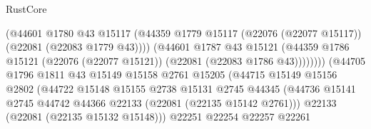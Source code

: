 \begin{lexlean}{RustCore}
\begin{coremodule}
                                            (@44601
                                              @1780
                                              @43
                                              @15117
                                              (@44359
                                                @1779
                                                @15117
                                                (@22076 (@22077 @15117))
                                                (@22081 (@22083 @1779 @43))))
                                            (@44601
                                              @1787
                                              @43
                                              @15121
                                              (@44359
                                                @1786
                                                @15121
                                                (@22076 (@22077 @15121))
                                                (@22081 (@22083 @1786 @43))))))))
                                    (@44705
                                      @1796
                                      @1811
                                      @43
                                      @15149
                                      @15158
                                      @2761
                                      @15205
                                      (@44715
                                        @15149
                                        @15156
                                        @2802
                                        (@44722
                                          @15148
                                          @15155
                                          @2738
                                          @15131
                                          @2745
                                          @44345
                                          (@44736
                                            @15141
                                            @2745
                                            @44742
                                            @44366
                                            @22133
                                            (@22081 (@22135 @15142 @2761)))
                                          @22133
                                          (@22081 (@22135 @15132 @15148)))
                                        @22251
                                        @22254
                                        @22257
                                        @22261

\end{coremodule}
\end{lexlean}

